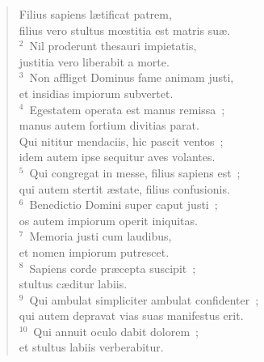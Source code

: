 \begin{flushleft}\begin{verse}\vspace{-19pt}\hspace{6pt}Filius sapiens l\ae tificat patrem,\\\hspace{6pt} filius vero stultus mœstitia est matris su\ae .\\
${}^{2}$~Nil proderunt thesauri impietatis,\\ justitia vero liberabit a morte.\\
${}^{3}$~Non affliget Dominus fame animam justi,\\ et insidias impiorum subvertet.\\
${}^{4}$~Egestatem operata est manus remissa~;\\ manus autem fortium divitias parat.\\ Qui nititur mendaciis, hic pascit ventos~;\\ idem autem ipse sequitur aves volantes.\\
${}^{5}$~Qui congregat in messe, filius sapiens est~;\\ qui autem stertit \ae state, filius confusionis.\\
${}^{6}$~Benedictio Domini super caput justi~;\\ os autem impiorum operit iniquitas.\\
${}^{7}$~Memoria justi cum laudibus,\\ et nomen impiorum putrescet.\\
${}^{8}$~Sapiens corde pr\ae cepta suscipit~;\\ stultus c\ae ditur labiis.\\
${}^{9}$~Qui ambulat simpliciter ambulat confidenter~;\\ qui autem depravat vias suas manifestus erit.\\
${}^{10}$~Qui annuit oculo dabit dolorem~;\\ et stultus labiis verberabitur.\end{verse}\end{flushleft}



